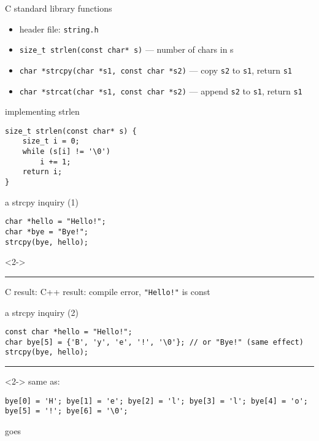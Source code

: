 \begin{frame}[fragile,label=cStrLib]{C standard library functions}
\lstset{
    language=C++,style=small
}
\begin{itemize}
    \item header file: \texttt{string.h}
    \vspace{.5cm}
    \item \lstinline|size_t strlen(const char* s)| --- number of chars in s
    \item \lstinline|char *strcpy(char *s1, const char *s2)| --- copy \texttt{s2} to \texttt{s1}, return \texttt{s1}
    \item \lstinline|char *strcat(char *s1, const char *s2)| --- append \texttt{s2} to \texttt{s1}, return \texttt{s1}
\end{itemize}
\end{frame}

\begin{frame}[fragile,label=strlenImpl]{implementing strlen}
\lstset{
    language=C++,style=small
}
\begin{lstlisting}
size_t strlen(const char* s) {
    size_t i = 0;
    while (s[i] != '\0')
        i += 1;
    return i;
}
\end{lstlisting}
\end{frame}

\begin{frame}[fragile,label=strcpyReadOnly]{a strcpy inquiry (1)}
\lstset{
    language=C++,style=small
}
\begin{lstlisting}
char *hello = "Hello!";
char *bye = "Bye!";
strcpy(bye, hello);
\end{lstlisting}
\begin{visibleenv}<2->
\hrule
C result: 
C++ result: compile error, \texttt{"Hello!"} is const
\end{visibleenv}
\end{frame}

\begin{frame}[fragile,label=strcpyTooSmall]{a strcpy inquiry (2)}
\lstset{
    language=C++,style=small
}
\begin{lstlisting}
const char *hello = "Hello!";
char bye[5] = {'B', 'y', 'e', '!', '\0'}; // or "Bye!" (same effect)
strcpy(bye, hello);
\end{lstlisting}
\hrule
\begin{visibleenv}<2->
same as:
\begin{lstlisting}
bye[0] = 'H'; bye[1] = 'e'; bye[2] = 'l'; bye[3] = 'l'; bye[4] = 'o';
bye[5] = '!'; bye[6] = '\0';
\end{lstlisting}
goes 
\end{visibleenv}
\end{frame}

